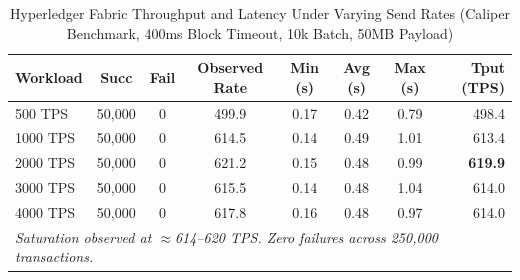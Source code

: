 \begin{table}[!t]
\renewcommand{\arraystretch}{1.2}
\caption{Hyperledger Fabric Throughput and Latency Under Varying Send Rates (Caliper Benchmark, 400ms Block Timeout, 10k Batch, 50MB Payload)}
\label{tab:caliper}
\centering
\begin{tabular}{lccccccr}
\hline
\textbf{Workload} & \textbf{Succ} & \textbf{Fail} & \textbf{Observed Rate} & \textbf{Min (s)} & \textbf{Avg (s)} & \textbf{Max (s)} & \textbf{Tput (TPS)} \\
\hline
500 TPS  & 50,000 & 0 & 499.9 & 0.17 & 0.42 & 0.79 & 498.4 \\
1000 TPS & 50,000 & 0 & 614.5 & 0.14 & 0.49 & 1.01 & 613.4 \\
2000 TPS & 50,000 & 0 & 621.2 & 0.15 & 0.48 & 0.99 & \textbf{619.9} \\
3000 TPS & 50,000 & 0 & 615.5 & 0.14 & 0.48 & 1.04 & 614.0 \\
4000 TPS & 50,000 & 0 & 617.8 & 0.16 & 0.48 & 0.97 & 614.0 \\
\hline
\multicolumn{8}{l}{\textit{Saturation observed at $\approx$614--620 TPS. Zero failures across 250,000 transactions.}} \\
\hline
\end{tabular}
\end{table}
